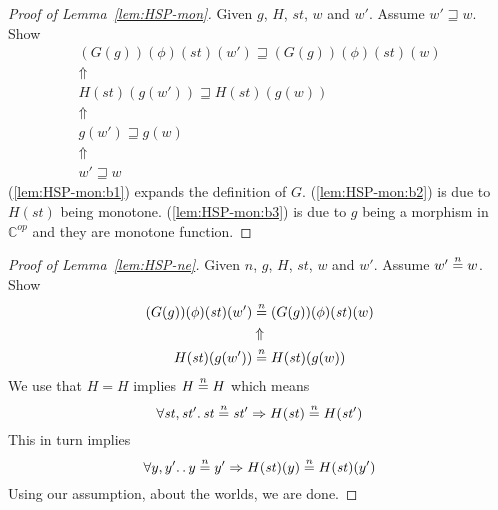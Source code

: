 \documentclass[a4paper]{article}
\newcommand{\nequal}[1][n]{\stackrel{\tiny{#1}}{=}}
\newcommand{\CatC}{\mathbb{C}}
\newcommand{\var}[1]{\mathit{#1}}
\newcommand{\future}{\mathbin{\sqsupseteq}}
\begin{document}
\begin{appendices}
\begin{proof}[Proof of Lemma~\ref{lem:HSP-mon}]
  Given $g$, $H$, $\var{st}$, $w$ and $w'$. Assume $w' \future w$. Show
  \begin{gather}
    (G(g))(\phi)(\var{st})(w') \future (G(g))(\phi)(\var{st})(w) \nonumber\\ 
    \Uparrow \label{lem:HSP-mon:b1}\\
    H(\var{st})(g(w')) \future H(\var{st})(g(w)) \nonumber \\
    \Uparrow \label{lem:HSP-mon:b2}\\
    g(w') \future g(w) \nonumber\\
    \Uparrow \label{lem:HSP-mon:b3}\\
    w' \future w \nonumber
  \end{gather}
(\ref{lem:HSP-mon:b1}) expands the definition of $G$. (\ref{lem:HSP-mon:b2}) is due to $H(\var{st})$ being monotone. (\ref{lem:HSP-mon:b3}) is due to $g$ being a morphism in $\CatC^{\var{op}}$ and they are monotone function.
\end{proof}

\begin{proof}[Proof of Lemma~\ref{lem:HSP-ne}]
  Given $n$, $g$, $H$, $\var{st}$, $w$ and $w'$. Assume $w' \nequal w$. Show
  \begin{gather}
    (G(g))(\phi)(\var{st})(w') \nequal (G(g))(\phi)(\var{st})(w) \nonumber\\ 
    \Uparrow \nonumber \\
    H(\var{st})(g(w')) \nequal H(\var{st})(g(w)) \nonumber \\
  \end{gather}
  We use that $H=H$ implies $H \nequal H$ which means
  \[
    \forall \var{st}, \var{st'} \ldotp \var{st} \nequal \var{st'} \Rightarrow H(\var{st}) \nequal H(\var{st'})
  \]
  This in turn implies
  \[
    \forall y,y' \ldotp \ldotp y \nequal y' \Rightarrow H(\var{st})(y) \nequal H(\var{st})(y')
  \]
  Using our assumption, about the worlds, we are done.
\end{proof}


\end{appendices}
\end{document}
